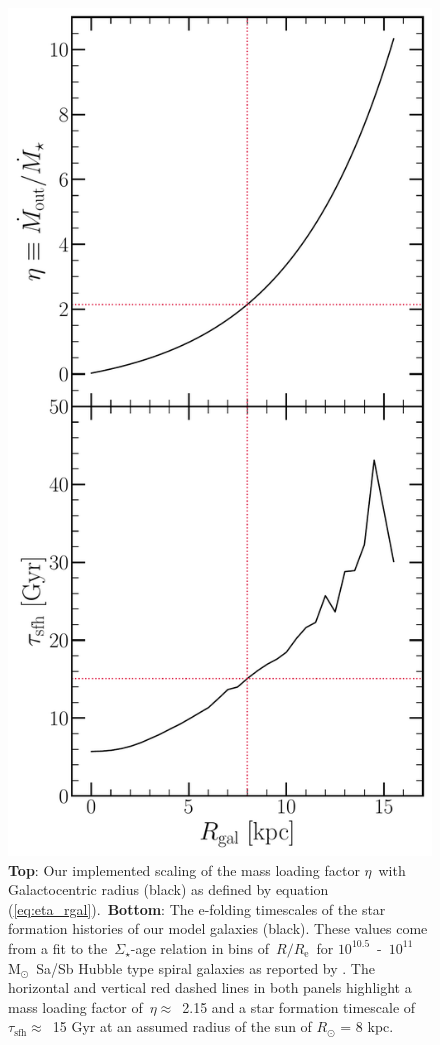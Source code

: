 \documentclass[fleqn, usenatbib]{mnras}
\newcommand{\refp}[1]{(\ref{#1})}
\newcommand{\msun}{\ensuremath{\text{M}_\odot}}
\begin{document}
\begin{figure} 
\centering 
\includegraphics[scale = 0.45]{eta_tau_sfh.pdf} 
\caption{\textbf{Top}: Our implemented scaling of the mass loading factor 
$\eta$~with Galactocentric radius (black) as defined by equation 
\refp{eq:eta_rgal}.~\textbf{Bottom}: The e-folding timescales of the star 
formation histories of our model galaxies (black). These values come from a 
fit to the~$\Sigma_\star$-age relation in bins of~$R/R_\text{e}$~for 
$10^{10.5}$~-~$10^{11}$~\msun~Sa/Sb Hubble type spiral galaxies as reported by 
\citet[][see discussion in~\S~\ref{sec:methods:sfhs}]{Sanchez2020}. The 
horizontal and vertical red dashed lines in both panels highlight a mass 
loading factor of~$\eta \approx$~2.15 and a star formation timescale of 
$\tau_\text{sfh} \approx$~15 Gyr at an assumed radius of the sun of 
$R_\odot$ = 8 kpc. } 
\label{fig:eta_tau_sfh} 
\end{figure} 
\end{document}
